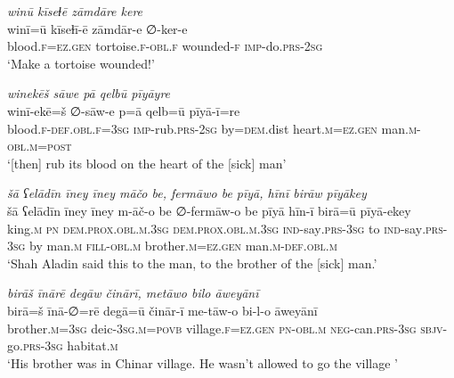 \ea \label{DG.49}
\textit{winū kīseɫē zāmdāre kere} \\ 
\gll winī=ū kīseɫī-ē zāmdār-e ∅-ker-e \\ 
 blood\textsc{\textsc{.f}}\textsc{=ez}\textsc{.gen} tortoise\textsc{\textsc{.f}}\textsc{-obl}\textsc{\textsc{.f}} wounded\textsc{-f} \textsc{imp-}do\textsc{.prs}-\textsc{2sg} \\ 
\glt `Make a tortoise wounded!'
\z 
 
\ea \label{DG.50}
\textit{winekēš sāwe pā qelbū pīyāyre} \\ 
\gll winī-ekē=š ∅-sāw-e p=ā qelb=ū pīyā-ī=re \\ 
 blood\textsc{\textsc{.f}}\textsc{-def}\textsc{.obl}\textsc{\textsc{.f}}\textsc{=3sg} \textsc{imp-}rub\textsc{.prs}-\textsc{2sg} by\textsc{=dem}.dist heart\textsc{.m}\textsc{=ez}\textsc{.gen} man\textsc{.m}\textsc{-obl}\textsc{.m}\textsc{=\textsc{post}} \\ 
\glt `[then] rub its blood on the heart of the [sick] man'
\z 
 
\ea \label{DG.53}
\textit{šā ʕelādīn īney īney māčo be, fermāwo be pīyā, hīnī birāw pīyākey} \\ 
\gll šā ʕelādīn īney īney m-āč-o be ∅-fermāw-o be pīyā hīn-ī birā=ū pīyā-ekey \\ 
 king\textsc{.m} \textsc{pn} \textsc{dem.prox}\textsc{.obl}\textsc{.m}\textsc{.3sg} \textsc{dem.prox}\textsc{.obl}\textsc{.m}\textsc{.3sg} \textsc{ind-}say\textsc{.prs}\textsc{-3sg} to \textsc{ind-}say\textsc{.prs}\textsc{-3sg} by man\textsc{.m} \textsc{fill}\textsc{-obl}\textsc{.m} brother\textsc{.m}\textsc{=ez}\textsc{.gen} man\textsc{.m}\textsc{-def}\textsc{.obl}\textsc{.m} \\ 
\glt `Shah Aladin said this to the man, to the brother of the [sick] man.'
\z 
 
\ea \label{DG.54}
\textit{birāš īnārē degāw činārī, metāwo bilo āweyānī} \\ 
\gll birā=š īnā-∅=rē degā=ū činār-ī me-tāw-o bi-l-o āweyānī \\ 
 brother\textsc{.m}\textsc{=3sg} deic\textsc{-3sg}\textsc{.m}\textsc{=\textsc{povb}} village\textsc{\textsc{.f}}\textsc{=ez}\textsc{.gen} \textsc{pn}\textsc{-obl}\textsc{.m} \textsc{neg-}can\textsc{.prs}\textsc{-3sg} \textsc{sbjv-}go\textsc{.prs}\textsc{-3sg} habitat\textsc{\textsc{.m}} \\ 
\glt `His brother was in Chinar village. He wasn’t allowed to go the village '
\z 
 
